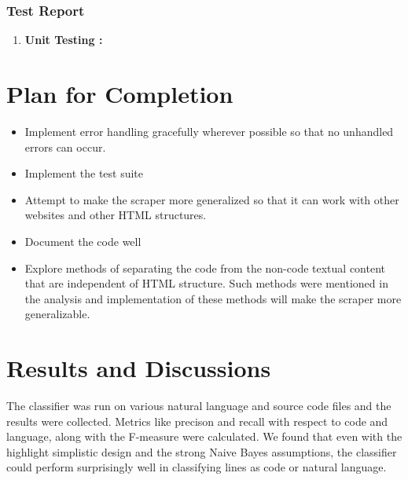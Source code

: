 \documentclass[12pt]{scrreprt}
\begin{document}
\subsection{Test Report}

\begin{enumerate}
    \item \textbf{Unit Testing : }
    
\end{enumerate}






\chapter{Plan for Completion}


\begin{itemize}
    \item Implement error handling gracefully wherever possible so that no unhandled errors can occur.
    \item Implement the test suite
    \item Attempt to make the scraper more generalized so that it can work with other websites and other HTML structures.
    \item Document the code well
    \item Explore methods of separating the code from the non-code textual content that are independent of HTML structure. Such methods were mentioned in the analysis and implementation of these methods will make the scraper more generalizable. 
\end{itemize}


\chapter{Results and Discussions}

The classifier was run on various natural language and source code files and the results were collected. Metrics like precison and recall with respect to code and language, along with the F-measure were calculated. We found that even with the highlight simplistic design and the strong Naive Bayes assumptions, the classifier could perform surprisingly well in classifying lines as code or natural language.

\end{document}

